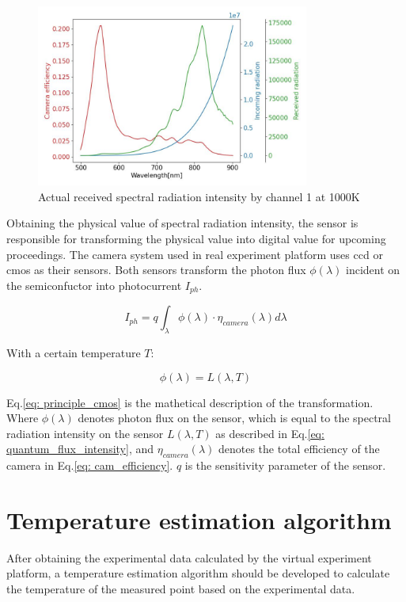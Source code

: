 \begin{figure}[htbp]
    \centering
    \includegraphics[width = 0.8\textwidth]{figures/received_radiation.jpg}
    \caption{Actual received spectral radiation intensity by channel 1 at 1000K}
    \label{fig: received}
\end{figure}


Obtaining the physical value of spectral radiation intensity, the sensor is responsible 
for transforming the physical value into digital value for upcoming proceedings.
The camera system used in real experiment platform uses \gls{ccd} or \gls{cmos}
as their sensors. Both sensors transform the photon flux $\phi (\lambda)$ 
incident on the semiconfuctor into photocurrent $I_{ph}$\cite{Fossum.2014}. 

\begin{equation}
    \label{eq: principle_cmos}
    I_{ph} = q \int_{\lambda}^{} \phi(\lambda) \cdot \eta_{camera}(\lambda) d\lambda
\end{equation}

With a certain temperature $T$: 

\begin{equation}
    \label{eq: quantum_flux_intensity}
    \phi(\lambda) = L(\lambda, T)
\end{equation}

Eq.\ref{eq: principle_cmos} is the mathetical description of the 
transformation. Where $\phi(\lambda)$ denotes photon flux on the sensor, 
which is equal to the spectral radiation intensity on the sensor $L(\lambda, T)$ as 
described in Eq.\ref{eq: quantum_flux_intensity}, and $\eta_{camera}(\lambda)$
denotes the total efficiency of the camera in Eq.\ref{eq: cam_efficiency}. $q$ is the sensitivity parameter 
of the sensor.


\section{Temperature estimation algorithm}
After obtaining the experimental data calculated by the virtual experiment platform, 
a temperature estimation algorithm should be developed to calculate the temperature 
of the measured point based on the experimental data.


